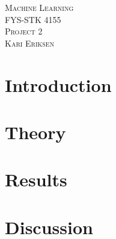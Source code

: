 \documentclass[a4paper,12pt, english]{article}
\begin{document}
\begin{titlepage}
\begin{center}
\textsc{\Large Machine Learning}\\[0.2cm]
\textsc{FYS-STK 4155}\\[1.0cm]
\textsc{\Large Project 2}\\[0.2cm]
\textsc{Kari Eriksen}\\[1.0cm]

\begin{abstract}

\end{abstract}

\end{center}
\end{titlepage}

\section*{Introduction}

\section*{Theory}

\section*{Results}

\section*{Discussion}
\end{document}

